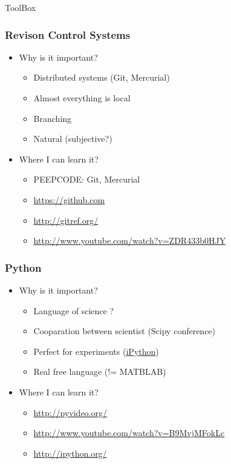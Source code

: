 \documentclass[fleqn]{beamer}
\begin{document}
\begin{section}{ToolBox}
  \begin{frame}\frametitle{Revison Control Systems}
  \begin{itemize}
    \item{Why is it important?}
      \begin{itemize}
      \item Distributed systems (Git, Mercurial)
      \item Almost everything is local
      \item Branching
      \item Natural (subjective?)
      \end{itemize}
    \item{Where I can learn it?}
      \begin{itemize}
        \item PEEPCODE: Git, Mercurial
        \item \url{https://github.com}
        \item \url{http://gitref.org/}
        \item \url{http://www.youtube.com/watch?v=ZDR433b0HJY}

      \end{itemize}
  \end{itemize}
  \end{frame}


  \begin{frame}\frametitle{Python}
  \begin{itemize}
    \item{Why is it important?}
      \begin{itemize}
      \item Language of science ? 
      \item Cooparation between scientist (Scipy conference)
      \item Perfect for experiments (\href{http://ipython.org/ipython-doc/rel-0.12/_static/notebook_specgram.png}{iPython})
      \item Real free language (!= MATBLAB)

      \end{itemize}
    \item{Where I can learn it?}
      \begin{itemize}
      \item \url{http://pyvideo.org/}
      \item \url{http://www.youtube.com/watch?v=B9MvjMFokLc}
      \item \url{http://ipython.org/}


\end{itemize}
\end{itemize}
\end{frame}
\end{section}
\end{document}
